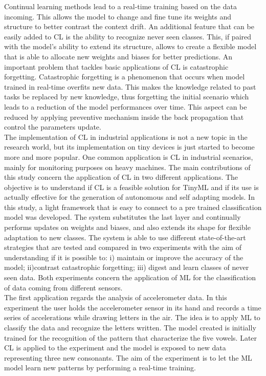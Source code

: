 \documentclass[12pt]{report}
\begin{document}
Continual learning methods lead to a real-time training based on the data incoming. This allows the model to change and fine tune its weights and structure to better contrast the context drift.
An additional feature that can be easily added to CL is the ability to recognize never seen classes. This, if paired with the model's ability to extend its structure, allows to create a flexible model that is able to allocate new weights and biases for better predictions.
An important problem that tackles basic applications of CL is catastrophic forgetting. Catastrophic forgetting is a phenomenon that occurs when model trained in real-time overfits new data. This makes the knowledge related to past tasks be replaced by new knowledge, thus forgetting the initial scenario which leads to a reduction of the model performances over time. This aspect can be reduced by applying preventive mechanism inside the back propagation that control the parameters update. \\
The implementation of CL in industrial applications is not a new topic in the research world, but its implementation on tiny devices is just started to become more and more popular. One common application is CL in industrial scenarios, mainly for monitoring purposes on heavy machines.
The main contributions of this study concern the application of CL in two different applications. The objective is to understand if CL is a feasible solution for TinyML and if its use is actually effective for the generation of autonomous and self adapting models. In this study, a light framework that is easy to connect to a pre trained classification model was developed. The system substitutes the last layer and continually performs updates on weights and biases, and also extends its shape for flexible adaptation to new classes. The system is able to use different state-of-the-art strategies that are tested and compared in two experiments with the aim of understanding if it is possible to: i) maintain or improve the accuracy of the model; ii)contrast catastrophic forgetting; iii) digest and learn classes of never seen data. Both experiments concern the application of ML for the classification of data coming from different sensors. \\
The first application regards the analysis of accelerometer data. In this experiment the user holds the accelerometer sensor in its hand and records a time series of accelerations while drawing letters in the air. The idea is to apply ML to classify the data and recognize the letters written. The model created is initially trained for the recognition of the pattern that characterize the five vowels. Later CL is applied to the experiment and the model is exposed to new data representing three new consonants. The aim of the experiment is to let the ML model learn new patterns by performing a real-time training.
\end{document}
